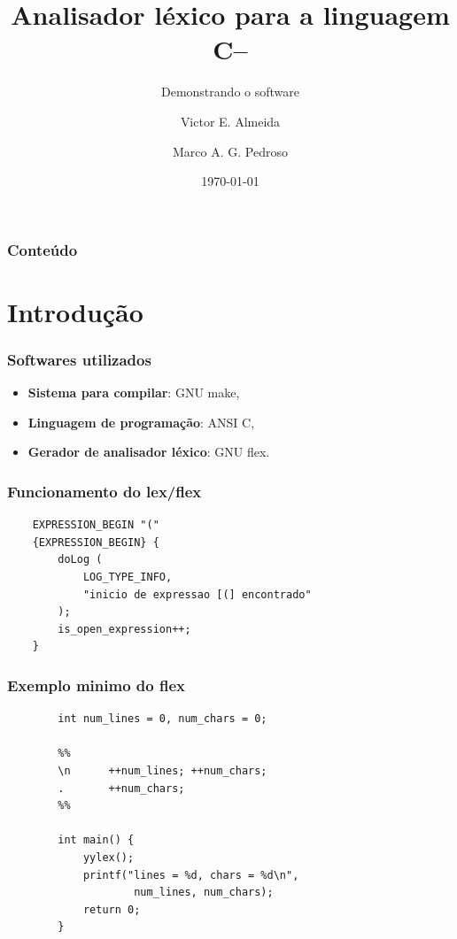 \documentclass[12pt]{beamer}
\author[Grupo: c--]{Victor E. Almeida \and Marco A. G. Pedroso}
\title{Analisador léxico para a linguagem C--}
\subtitle{Demonstrando o software}
\date{\today}
\institute{UNIOESTE}
\begin{document}
\frame{\titlepage}

\begin{frame}
\frametitle{Conteúdo}
\tableofcontents
\end{frame}

\section{Introdução}\label{Introdução}
\begin{frame}
    \frametitle{Softwares utilizados}
    \begin{itemize}
        \item \textbf{Sistema para compilar}: GNU make,
        \item \textbf{Linguagem de programação}: ANSI C,
        \item \textbf{Gerador de analisador léxico}: GNU flex.
    \end{itemize}
\end{frame}

\begin{frame}[t,fragile]{\insertsectionhead}
    \frametitle{Funcionamento do lex/flex}

    \begin{lstlisting}
    EXPRESSION_BEGIN "("
    {EXPRESSION_BEGIN} {
        doLog (
            LOG_TYPE_INFO,
            "inicio de expressao [(] encontrado"
        );
        is_open_expression++;
    }
    \end{lstlisting}
\end{frame}

\begin{frame}[t,fragile]{\insertsectionhead}
    \frametitle{Exemplo minimo do flex}
    \begin{lstlisting}
        int num_lines = 0, num_chars = 0;

        %%
        \n      ++num_lines; ++num_chars;
        .       ++num_chars;
        %%

        int main() {
            yylex();
            printf("lines = %d, chars = %d\n",
                    num_lines, num_chars);
            return 0;
        }
    \end{lstlisting}
\end{frame}
\end{document}
